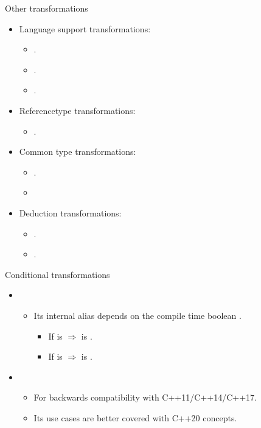 \begin{frame}[t,fragile]{Other transformations}
\begin{itemize}
  \item Language support transformations:
    \begin{itemize}
      \item {}.
      \item {}.
      \item {}.
    \end{itemize}
  \item Referencetype transformations:
    \begin{itemize}
      \item {}.
    \end{itemize}
  \item Common type transformations:
    \begin{itemize}
      \item {}.
      \item {}
    \end{itemize}
  \item Deduction transformations:
    \begin{itemize}
      \item {}.
      \item {}.
    \end{itemize}
\end{itemize}
\end{frame}

\begin{frame}[t,fragile]{Conditional transformations}
\begin{itemize}
  \item {}
    \begin{itemize}
      \item Its internal alias  depends on the compile time
            boolean .
        \begin{itemize}
          \item If  is  $\Rightarrow$ 
                 is .
          \item If  is  $\Rightarrow$ 
                 is .
        \end{itemize}

    \end{itemize}

  \item {}
    \begin{itemize}
      \item For backwards compatibility with C++11/C++14/C++17.
      \item Its use cases are better covered with C++20 concepts.
    \end{itemize}
\end{itemize}
\end{frame}
